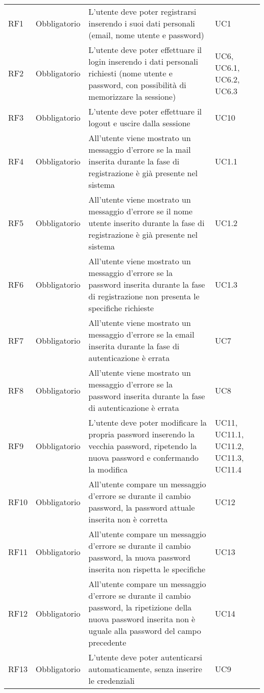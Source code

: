 {\begin{longtable}{C{.15\freewidth} C{.2\freewidth} C{.528\freewidth} C{.15\freewidth}}
      RF1 & Obbligatorio & L'utente deve poter registrarsi inserendo i suoi dati personali (email, nome utente e password) & UC1 \\
      RF2 & Obbligatorio & L'utente deve poter effettuare il login inserendo i dati personali richiesti (nome utente e password, con possibilità di memorizzare la sessione) & UC6, UC6.1, UC6.2, UC6.3 \\
      RF3 & Obbligatorio & L'utente deve poter effettuare il logout e uscire dalla sessione & UC10 \\
      RF4 & Obbligatorio & All'utente viene mostrato un messaggio d'errore se la mail inserita durante la fase di registrazione è già presente nel sistema  & UC1.1 \\
      RF5 & Obbligatorio & All'utente viene mostrato un messaggio d'errore se il nome utente inserito durante la fase di registrazione è già presente nel sistema & UC1.2 \\
      RF6 & Obbligatorio & All'utente viene mostrato un messaggio d'errore se la password inserita durante la fase di registrazione non presenta le specifiche richieste & UC1.3 \\
      RF7 & Obbligatorio & All'utente viene mostrato un messaggio d'errore se la email inserita durante la fase di autenticazione è errata & UC7\\
      RF8 & Obbligatorio & All'utente viene mostrato un messaggio d'errore se la password inserita durante la fase di autenticazione è errata & UC8 \\
      RF9 & Obbligatorio & L'utente deve poter modificare la propria password inserendo la vecchia password, ripetendo la nuova password e confermando la modifica & UC11, UC11.1, UC11.2, UC11.3, UC11.4\\
      RF10 & Obbligatorio & All'utente compare un messaggio d'errore se durante il cambio password, la password attuale inserita non è corretta & UC12 \\
      RF11 & Obbligatorio & All'utente compare un messaggio d'errore se durante il cambio password, la nuova password inserita non rispetta le specifiche & UC13 \\
      RF12 & Obbligatorio & All'utente compare un messaggio d'errore se durante il cambio password, la ripetizione della nuova password inserita non è uguale alla password del campo precedente & UC14 \\
      RF13 & Obbligatorio & L'utente deve poter autenticarsi automaticamente, senza inserire le credenziali & UC9\\

\end{longtable}}
